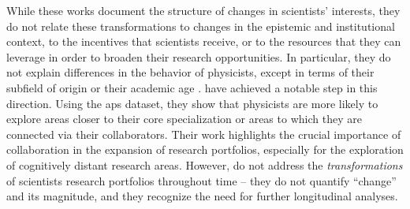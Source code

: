 \documentclass{article}
\begin{document}
While these works document the structure of changes in scientists' interests, they do not relate these transformations to changes in the epistemic and institutional context, to the incentives that scientists receive, or to the resources that they can leverage in order to broaden their research opportunities. %
In particular, they do not explain differences in the behavior of physicists, except in terms of their subfield of origin or their academic age \citep{Zeng2019,Aleta2019}. \citet{Tripodi2020} have achieved a notable step in this direction. Using the \gls{aps} dataset, they show that physicists are more likely to explore areas closer to their core specialization or areas to which they are connected via their collaborators. Their work highlights the crucial importance of collaboration in the expansion of research portfolios, especially for the exploration of cognitively distant research areas. %
However, \citeauthor{Tripodi2020} do not address the \textit{transformations} of scientists research portfolios throughout time -- they do not quantify ``change'' and its magnitude, and they recognize the need for further longitudinal analyses.
\end{document}
